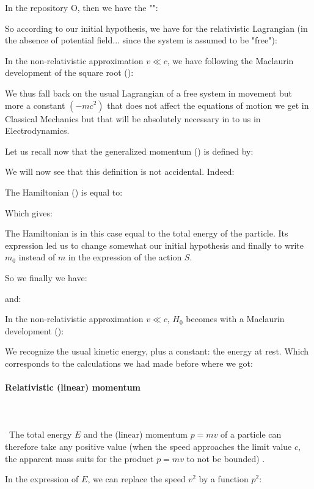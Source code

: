 	In the repository O, then we have the "":
	
	So according to our initial hypothesis, we have for the relativistic Lagrangian (in the absence of potential field... since the system is assumed to be "free"):
	
	In the non-relativistic approximation $v\ll c$, we have following the Maclaurin development of the square root ():
	
	We thus fall back on the usual Lagrangian of a free system in movement but more a constant $(-mc^2)$ that does not affect the equations of motion we get in Classical Mechanics but that will be absolutely necessary in to us in Electrodynamics.

	Let us recall now that the generalized momentum () is defined by:
	
	We will now see that this definition is not accidental. Indeed:
	
	The Hamiltonian () is equal to:
	
	Which gives:
	
	The Hamiltonian is in this case equal to the total energy of the particle. Its expression led us to change somewhat our initial hypothesis and finally to write $m_0$ instead of $m$ in the expression of the action $S$.

	So we finally we have:
	
	and:
	
	In the non-relativistic approximation $v\ll c$, $H_0$ becomes with a Maclaurin development ():
	
	We recognize the usual kinetic energy, plus a constant: the energy at rest. Which corresponds to the calculations we had made before where we got:
	
	
	\paragraph{Relativistic (linear) momentum}\mbox{}\\\\\
	The total energy $E$ and the (linear) momentum $p=mv$ of a particle can therefore take any positive value (when the speed approaches the limit value $c$, the apparent mass suits for the product $p=mv$ to not be bounded) .

	In the expression of $E$, we can replace the speed $v^2$ by a function $p^2$:
	
